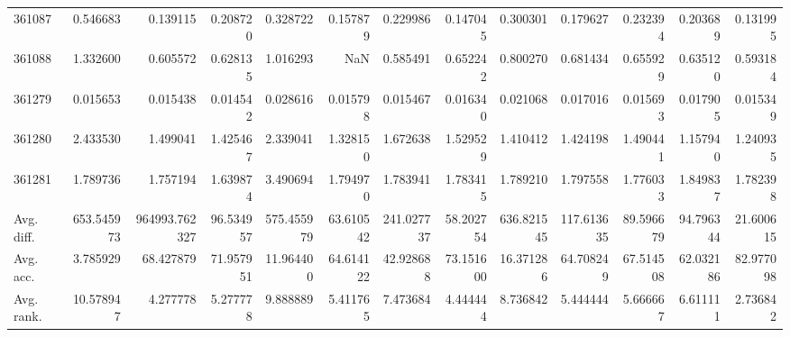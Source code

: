 \begin{tabular}{lrrrrrrrrrrrr}
361087 & 0.546683 & 0.139115 & 0.208720 & 0.328722 & 0.157879 & 0.229986 & 0.147045 & 0.300301 & 0.179627 & 0.232394 & 0.203689 & 0.131995 \\
361088 & 1.332600 & 0.605572 & 0.628135 & 1.016293 & NaN & 0.585491 & 0.652242 & 0.800270 & 0.681434 & 0.655929 & 0.635120 & 0.593184 \\
361279 & 0.015653 & 0.015438 & 0.014542 & 0.028616 & 0.015798 & 0.015467 & 0.016340 & 0.021068 & 0.017016 & 0.015693 & 0.017905 & 0.015349 \\
361280 & 2.433530 & 1.499041 & 1.425467 & 2.339041 & 1.328150 & 1.672638 & 1.529529 & 1.410412 & 1.424198 & 1.490441 & 1.157940 & 1.240935 \\
361281 & 1.789736 & 1.757194 & 1.639874 & 3.490694 & 1.794970 & 1.783941 & 1.783415 & 1.789210 & 1.797558 & 1.776033 & 1.849837 & 1.782398 \\
Avg. diff. & 653.545973 & 964993.762327 & 96.534957 & 575.455979 & 63.610542 & 241.027737 & 58.202754 & 636.821545 & 117.613635 & 89.596679 & 94.796344 & 21.600615 \\
Avg. acc. & 3.785929 & 68.427879 & 71.957951 & 11.964400 & 64.614122 & 42.928688 & 73.151600 & 16.371286 & 64.708249 & 67.514508 & 62.032186 & 82.977098 \\
Avg. rank. & 10.578947 & 4.277778 & 5.277778 & 9.888889 & 5.411765 & 7.473684 & 4.444444 & 8.736842 & 5.444444 & 5.666667 & 6.611111 & 2.736842 \\
\bottomrule
\end{tabular}
